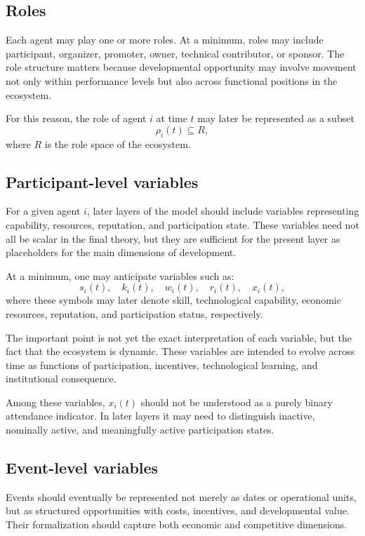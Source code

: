 \documentclass[11pt]{article}
\begin{document}
\subsection{Roles}

Each agent may play one or more roles. At a minimum, roles may include participant, organizer, promoter, owner, technical contributor, or sponsor. The role structure matters because developmental opportunity may involve movement not only within performance levels but also across functional positions in the ecosystem.

For this reason, the role of agent \(i\) at time \(t\) may later be represented as a subset
\[
\rho_i(t) \subseteq R,
\]
where \(R\) is the role space of the ecosystem.

\subsection{Participant-level variables}

For a given agent \(i\), later layers of the model should include variables representing capability, resources, reputation, and participation state. These variables need not all be scalar in the final theory, but they are sufficient for the present layer as placeholders for the main dimensions of development.

At a minimum, one may anticipate variables such as:
\[
s_i(t), \quad k_i(t), \quad w_i(t), \quad r_i(t), \quad x_i(t),
\]
where these symbols may later denote skill, technological capability, economic resources, reputation, and participation status, respectively.

The important point is not yet the exact interpretation of each variable, but the fact that the ecosystem is dynamic. These variables are intended to evolve across time as functions of participation, incentives, technological learning, and institutional consequence.

Among these variables, \(x_i(t)\) should not be understood as a purely binary attendance indicator. In later layers it may need to distinguish inactive, nominally active, and meaningfully active participation states.

\subsection{Event-level variables}

Events should eventually be represented not merely as dates or operational units, but as structured opportunities with costs, incentives, and developmental value. Their formalization should capture both economic and competitive dimensions.
\end{document}
